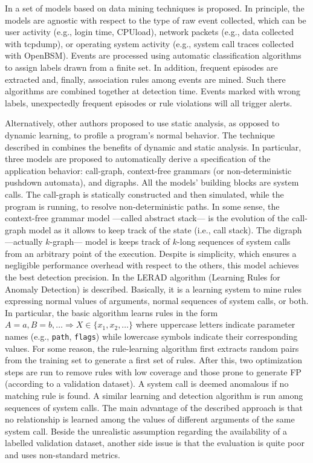 \documentclass[12pt]{article}
\theoremstyle{definition}
\begin{document}
			
			In \citep{lee:2000:framework} a set of models based on data mining
			techniques is proposed. In principle, the models are agnostic with
			respect to the type of raw event collected, which can be user activity
			(e.g., login time, CPUload), network packets (e.g.,
			data collected with tcpdump), or operating
			system activity (e.g., system call traces collected with OpenBSM). Events are processed using automatic classification
			algorithms to assign labels drawn from a finite set. In addition,
			frequent episodes are extracted and, finally, association rules among
			events are mined. Such there algorithms are combined together at
			detection time. Events marked with wrong labels, unexpectedly frequent
			episodes or rule violations will all trigger alerts.
			
			
			Alternatively, other authors proposed to use static analysis, as
			opposed to dynamic learning, to profile a program's normal
			behavior. The technique described in
			\citep{wagner:sp2001:staticanalysis} combines the benefits of dynamic
			and static analysis. In particular, three models are proposed to
			automatically derive a specification of the application behavior:
			call-graph, context-free grammars (or non-deterministic pushdown
			automata), and digraphs. All the models' building blocks are system
			calls. The call-graph is statically constructed and then simulated,
			while the program is running, to resolve non-deterministic paths. In
			some sense, the context-free grammar model ---called abstract stack---
			is the evolution of the call-graph model as it allows to keep track of
			the state (i.e., call stack). The digraph ---actually $k$-graph---
			model is keeps track of $k$-long sequences of system calls from an
			arbitrary point of the execution. Despite is simplicity, which ensures
			a negligible performance overhead with respect to the others, this
			model achieves the best detection precision.
			In \citep{rulessystemcallarguments} the LERAD
			algorithm (Learning Rules for Anomaly Detection) is
			described. Basically, it is a learning system to mine rules expressing
			normal values of arguments, normal sequences of system calls, or
			both. In particular, the basic algorithm learns rules in the form $A =
			a, B = b, \dots \Rightarrow X \in \{x_{1}, x_{2}, \dots\}$ where
			uppercase letters indicate parameter names (e.g., \texttt{path},
			\texttt{flags}) while lowercase symbols indicate their corresponding
			values. For some reason, the rule-learning algorithm first extracts
			random pairs from the training set to generate a first set of
			rules. After this, two optimization steps are run to remove rules with
			low coverage and those prone to generate FP (according
			to a validation dataset). A system call is deemed anomalous if no
			matching rule is found. A similar learning and detection algorithm is
			run among sequences of system calls. The main advantage of the
			described approach is that no relationship is learned among the values
			of different arguments of the same system call. Beside the unrealistic
			assumption regarding the availability of a labelled validation dataset,
			another side issue is that the evaluation is quite poor and uses
			non-standard metrics.
			
\end{document}
